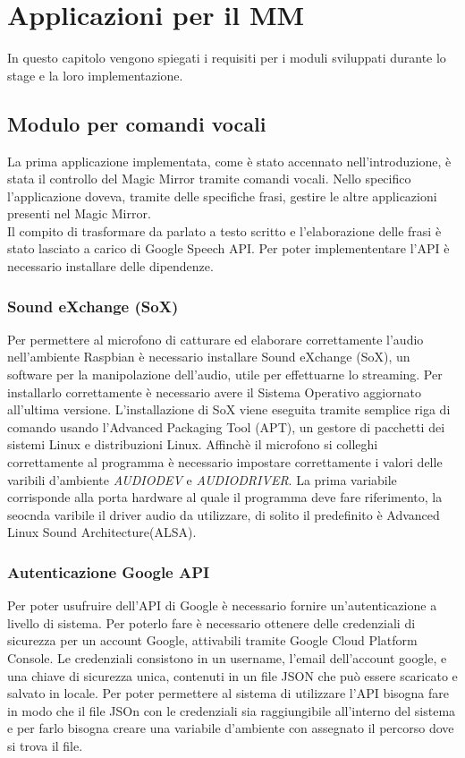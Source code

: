 \chapter{Applicazioni per il MM}\label{capitolo4}
In questo capitolo vengono spiegati i requisiti per i moduli sviluppati durante lo stage e la loro implementazione.

\section{Modulo per comandi vocali}
La prima applicazione implementata, come è stato accennato nell'introduzione, è
stata il controllo del Magic Mirror tramite comandi vocali.
Nello specifico l'applicazione doveva, tramite delle specifiche frasi,
gestire le altre applicazioni presenti nel Magic Mirror.\\
Il compito di trasformare da parlato a testo scritto e l'elaborazione delle frasi è stato
lasciato a carico di Google Speech API.
Per poter implemententare l'API è necessario installare delle dipendenze.

\subsection{Sound eXchange (SoX)}
Per permettere al microfono di catturare ed elaborare correttamente l'audio nell'ambiente
Raspbian è necessario installare Sound eXchange (SoX), un software per la manipolazione
dell'audio, utile per effettuarne lo streaming.
Per installarlo correttamente è necessario avere il Sistema Operativo aggiornato all'ultima versione.
L'installazione di SoX viene eseguita tramite semplice riga di comando usando l'Advanced Packaging Tool (APT),
un gestore di pacchetti dei sistemi Linux e distribuzioni Linux.
Affinchè il microfono si colleghi correttamente al programma è necessario impostare correttamente
i valori delle varibili d'ambiente \textit{AUDIODEV} e \textit{AUDIODRIVER}.
La prima variabile corrisponde alla porta hardware al quale il programma deve fare riferimento,
la seocnda varibile il driver audio da utilizzare, di solito il predefinito è Advanced Linux Sound Architecture(ALSA).

\subsection{Autenticazione Google API}
Per poter usufruire dell'API di Google è necessario fornire un'autenticazione a livello
di sistema.
Per poterlo fare è necessario ottenere delle credenziali di sicurezza per un account Google,
attivabili tramite Google Cloud Platform Console.
Le credenziali consistono in un username, l'email dell'account google, e una chiave di sicurezza unica,
 contenuti in un file JSON che può essere scaricato e salvato in locale.
Per poter permettere al sistema di utilizzare l'API bisogna fare in modo che il file JSOn con le credenziali sia
raggiungibile all'interno del sistema e per farlo bisogna creare una variabile d'ambiente con assegnato il percorso
dove si trova il file.

